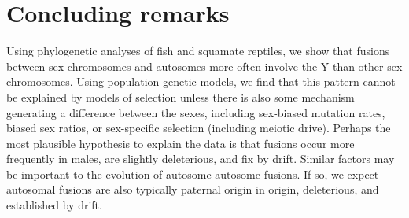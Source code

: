 \section{Concluding remarks}

Using phylogenetic analyses of fish and squamate reptiles, we show that fusions between sex chromosomes and autosomes more often involve the Y than other sex chromosomes. Using population genetic models, we find that this pattern cannot be explained by models of selection unless there is also some mechanism generating a difference between the sexes, including sex-biased mutation rates, biased sex ratios, or sex-specific selection (including meiotic drive). Perhaps the most plausible hypothesis to explain the data is that fusions occur more frequently in males, are slightly deleterious, and fix by drift. Similar factors may be important to the evolution of autosome-autosome fusions. If so, we expect autosomal fusions are also typically paternal origin in origin, deleterious, and established by drift.




